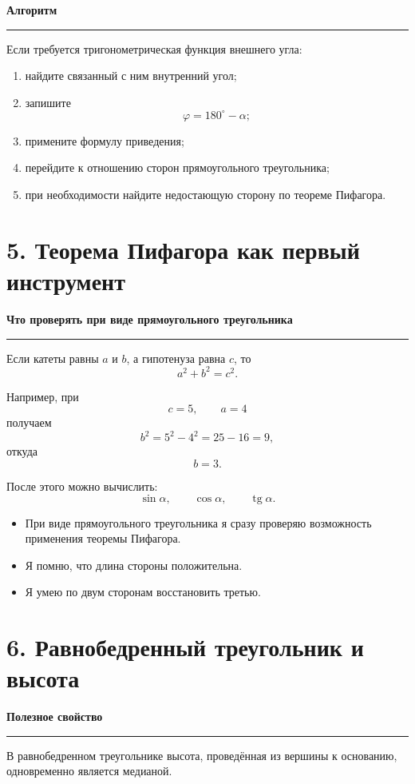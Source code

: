 \documentclass[a4paper,12pt]{article}
\DeclareMathOperator{\tg}{tg}
\newcommand{\checkitem}{\item[$\square$]}
\newcommand{\accentline}{%
    \vspace{0.2em}
    {\color{accent}\rule{\linewidth}{0.6pt}}
    \vspace{0.5em}
}
\newcommand{\topic}[1]{%
    \vspace{0.5em}
    {\large\bfseries\color{darkaccent}#1}\par
    \accentline
}
\begin{document}
\topic{Алгоритм}

Если требуется тригонометрическая функция внешнего угла:

\begin{enumerate}
    \item найдите связанный с ним внутренний угол;
    \item запишите
    \[
    \varphi=180^\circ-\alpha;
    \]
    \item примените формулу приведения;
    \item перейдите к отношению сторон прямоугольного треугольника;
    \item при необходимости найдите недостающую сторону по теореме Пифагора.
\end{enumerate}


\section*{\color{darkaccent}5. Теорема Пифагора как первый инструмент}

\topic{Что проверять при виде прямоугольного треугольника}

Если катеты равны $a$ и $b$, а гипотенуза равна $c$, то
\[
\boxed{a^2+b^2=c^2}.
\]

Например, при
\[
c=5,\qquad a=4
\]
получаем
\[
b^2=5^2-4^2=25-16=9,
\]
откуда
\[
b=3.
\]

После этого можно вычислить:
\[
\sin\alpha,\qquad
\cos\alpha,\qquad
\tg\alpha.
\]

\begin{itemize}
\checkitem При виде прямоугольного треугольника я сразу проверяю возможность применения теоремы Пифагора.
\checkitem Я помню, что длина стороны положительна.
\checkitem Я умею по двум сторонам восстановить третью.
\end{itemize}


\section*{\color{darkaccent}6. Равнобедренный треугольник и высота}

\topic{Полезное свойство}

В равнобедренном треугольнике высота, проведённая из вершины к основанию,
одновременно является медианой.
\end{document}
